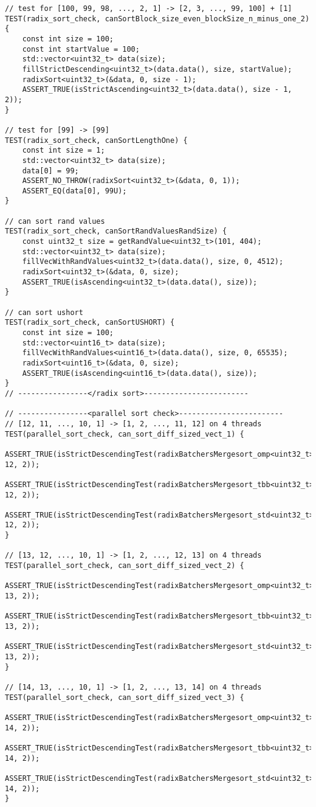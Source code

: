 \documentclass{report}
\begin{document}
\begin{lstlisting}
// test for [100, 99, 98, ..., 2, 1] -> [2, 3, ..., 99, 100] + [1]
TEST(radix_sort_check, canSortBlock_size_even_blockSize_n_minus_one_2) {
    const int size = 100;
    const int startValue = 100;
    std::vector<uint32_t> data(size);
    fillStrictDescending<uint32_t>(data.data(), size, startValue);
    radixSort<uint32_t>(&data, 0, size - 1);
    ASSERT_TRUE(isStrictAscending<uint32_t>(data.data(), size - 1, 2));
}

// test for [99] -> [99]
TEST(radix_sort_check, canSortLengthOne) {
    const int size = 1;
    std::vector<uint32_t> data(size);
    data[0] = 99;
    ASSERT_NO_THROW(radixSort<uint32_t>(&data, 0, 1));
    ASSERT_EQ(data[0], 99U);
}

// can sort rand values
TEST(radix_sort_check, canSortRandValuesRandSize) {
    const uint32_t size = getRandValue<uint32_t>(101, 404);
    std::vector<uint32_t> data(size);
    fillVecWithRandValues<uint32_t>(data.data(), size, 0, 4512);
    radixSort<uint32_t>(&data, 0, size);
    ASSERT_TRUE(isAscending<uint32_t>(data.data(), size));
}

// can sort ushort
TEST(radix_sort_check, canSortUSHORT) {
    const int size = 100;
    std::vector<uint16_t> data(size);
    fillVecWithRandValues<uint16_t>(data.data(), size, 0, 65535);
    radixSort<uint16_t>(&data, 0, size);
    ASSERT_TRUE(isAscending<uint16_t>(data.data(), size));
}
// ----------------</radix sort>------------------------

// ----------------<parallel sort check>------------------------
// [12, 11, ..., 10, 1] -> [1, 2, ..., 11, 12] on 4 threads
TEST(parallel_sort_check, can_sort_diff_sized_vect_1) {
    ASSERT_TRUE(isStrictDescendingTest(radixBatchersMergesort_omp<uint32_t>, 12, 2));
    ASSERT_TRUE(isStrictDescendingTest(radixBatchersMergesort_tbb<uint32_t>, 12, 2));
    ASSERT_TRUE(isStrictDescendingTest(radixBatchersMergesort_std<uint32_t>, 12, 2));
}

// [13, 12, ..., 10, 1] -> [1, 2, ..., 12, 13] on 4 threads
TEST(parallel_sort_check, can_sort_diff_sized_vect_2) {
    ASSERT_TRUE(isStrictDescendingTest(radixBatchersMergesort_omp<uint32_t>, 13, 2));
    ASSERT_TRUE(isStrictDescendingTest(radixBatchersMergesort_tbb<uint32_t>, 13, 2));
    ASSERT_TRUE(isStrictDescendingTest(radixBatchersMergesort_std<uint32_t>, 13, 2));
}

// [14, 13, ..., 10, 1] -> [1, 2, ..., 13, 14] on 4 threads
TEST(parallel_sort_check, can_sort_diff_sized_vect_3) {
    ASSERT_TRUE(isStrictDescendingTest(radixBatchersMergesort_omp<uint32_t>, 14, 2));
    ASSERT_TRUE(isStrictDescendingTest(radixBatchersMergesort_tbb<uint32_t>, 14, 2));
    ASSERT_TRUE(isStrictDescendingTest(radixBatchersMergesort_std<uint32_t>, 14, 2));
}


\end{lstlisting}
\end{document}
